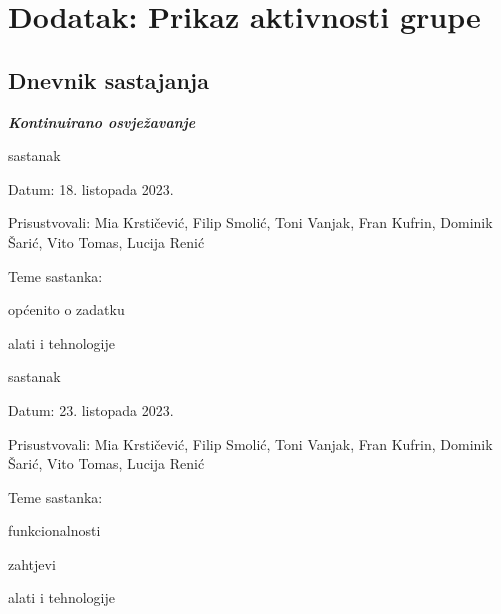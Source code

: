 \chapter*{Dodatak: Prikaz aktivnosti grupe}
		
		\section*{Dnevnik sastajanja}
		
		\textbf{\textit{Kontinuirano osvježavanje}}\\
		
		
		\begin{packed_enum}
			\item  sastanak
			
			\item[] \begin{packed_item}
				\item Datum: 18. listopada 2023.
				\item Prisustvovali: Mia Krstičević, Filip Smolić, Toni Vanjak, Fran Kufrin, Dominik Šarić, Vito Tomas, Lucija Renić
				\item Teme sastanka:
				\begin{packed_item}
					\item  općenito o zadatku
					\item  alati i tehnologije
				\end{packed_item}
			\end{packed_item}
			
			\item  sastanak
			\item[] \begin{packed_item}
				\item Datum: 23. listopada 2023.
				\item Prisustvovali: Mia Krstičević, Filip Smolić, Toni Vanjak, Fran Kufrin, Dominik Šarić, Vito Tomas, Lucija Renić
				\item Teme sastanka:
				\begin{packed_item}
					\item  funkcionalnosti
					\item  zahtjevi
					\item  alati i tehnologije
				\end{packed_item}
			\end{packed_item}
			

\end{packed_enum}
